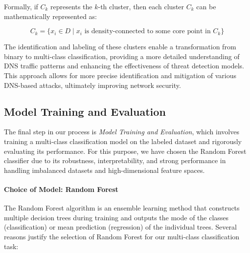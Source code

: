 Formally, if \(C_k\) represents the \(k\)-th cluster, then each cluster \(C_k\) can be mathematically represented as:

\[ C_k = \{x_i \in D \mid x_i \text{ is density-connected to some core point in } C_k\} \]

The identification and labeling of these clusters enable a transformation from binary to multi-class classification, providing a more detailed understanding of DNS traffic patterns and enhancing the effectiveness of threat detection models. This approach allows for more precise identification and mitigation of various DNS-based attacks, ultimately improving network security.









\subsection{Model Training and Evaluation}

The final step in our process is \textit{Model Training and Evaluation}, which involves training a multi-class classification model on the labeled dataset and rigorously evaluating its performance. For this purpose, we have chosen the Random Forest classifier due to its robustness, interpretability, and strong performance in handling imbalanced datasets and high-dimensional feature spaces.

\paragraph{Choice of Model: Random Forest}
The Random Forest algorithm is an ensemble learning method that constructs multiple decision trees during training and outputs the mode of the classes (classification) or mean prediction (regression) of the individual trees. Several reasons justify the selection of Random Forest for our multi-class classification task:

